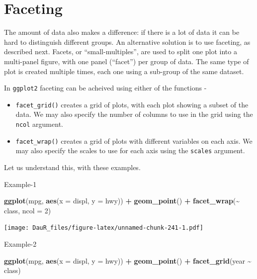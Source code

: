 \documentclass[
]{book}
\newenvironment{Shaded}{\begin{snugshade}}{\end{snugshade}}
\newcommand{\AttributeTok}[1]{\textcolor[rgb]{0.13,0.29,0.53}{#1}}
\newcommand{\DecValTok}[1]{\textcolor[rgb]{0.00,0.00,0.81}{#1}}
\newcommand{\FunctionTok}[1]{\textcolor[rgb]{0.13,0.29,0.53}{\textbf{#1}}}
\newcommand{\NormalTok}[1]{#1}
\newcommand{\SpecialCharTok}[1]{\textcolor[rgb]{0.81,0.36,0.00}{\textbf{#1}}}
\providecommand{\tightlist}{%
  \setlength{\itemsep}{0pt}\setlength{\parskip}{0pt}}
\begin{document}
\hypertarget{faceting}{%
\section{Faceting}\label{faceting}}

The amount of data also makes a difference: if there is a lot of data it can be hard to distinguish different groups. An alternative solution is to use faceting, as described next. Facets, or ``small-multiples'', are used to split one plot into a multi-panel figure, with one panel (``facet'') per group of data. The same type of plot is created multiple times, each one using a sub-group of the same dataset.

In \texttt{ggplot2} faceting can be acheived using either of the functions -

\begin{itemize}
\tightlist
\item
  \texttt{facet\_grid()} creates a grid of plots, with each plot showing a subset of the data. We may also specify the number of columns to use in the grid using the \texttt{ncol} argument.
\item
  \texttt{facet\_wrap()} creates a grid of plots with different variables on each axis. We may also specify the scales to use for each axis using the \texttt{scales} argument.
\end{itemize}

Let us understand this, with these examples.

Example-1

\begin{Shaded}
\begin{Highlighting}[]
\FunctionTok{ggplot}\NormalTok{(mpg, }\FunctionTok{aes}\NormalTok{(}\AttributeTok{x =}\NormalTok{ displ, }\AttributeTok{y =}\NormalTok{ hwy)) }\SpecialCharTok{+} 
  \FunctionTok{geom\_point}\NormalTok{() }\SpecialCharTok{+} 
  \FunctionTok{facet\_wrap}\NormalTok{(}\SpecialCharTok{\textasciitilde{}}\NormalTok{ class, }\AttributeTok{ncol =} \DecValTok{2}\NormalTok{)}
\end{Highlighting}
\end{Shaded}

\texttt{[image: DauR\_files/figure-latex/unnamed-chunk-241-1.pdf]}

Example-2

\begin{Shaded}
\begin{Highlighting}[]
\FunctionTok{ggplot}\NormalTok{(mpg, }\FunctionTok{aes}\NormalTok{(}\AttributeTok{x =}\NormalTok{ displ, }\AttributeTok{y =}\NormalTok{ hwy)) }\SpecialCharTok{+} 
  \FunctionTok{geom\_point}\NormalTok{() }\SpecialCharTok{+} 
  \FunctionTok{facet\_grid}\NormalTok{(year }\SpecialCharTok{\textasciitilde{}}\NormalTok{ class)}
\end{Highlighting}
\end{Shaded}
\end{document}
